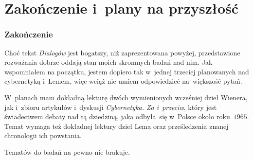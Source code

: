 \documentclass[10pt,t]{beamer}
\begin{document}
\section{Zakończenie i~plany na przyszłość}



\begin{frame}
  \frametitle{Zakończenie}


  Choć tekst \textit{Dialogów} jest bogatszy, niż zaprezentowana powyżej,
  przedstawione rozważania dobrze oddają stan moich skromnych badań nad nim.
  Jak wspomniałem na początku, jestem dopiero tak w~jednej trzeciej
  planowanych nad cybernetyką i~Lemem, więc wciąż nie umiem odpowiedzieć
  na~większość pytań.

  W~planach mam dokładną lekturę dwóch wymienionych wcześniej dzieł
  Wienera, jak i~zbioru artykułów i~dyskusji \textit{Cybernetyka. Za
    i~przeciw}, który jest świadectwem debaty nad tą dziedziną, jaka
  odbyła~się w~Polsce około roku~$1965$. Temat wymaga też dokładnej lektury
  dzieł Lema oraz prześledzenia znanej chronologii ich powstania.

  Tematów do badań na pewno nie brakuje.

\end{frame}










\appendix















\printbibliography











\end{document}
